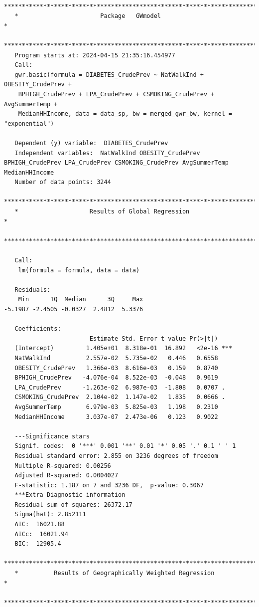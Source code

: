 \documentclass[
]{article}
\begin{document}
\begin{verbatim}
   ***********************************************************************
   *                       Package   GWmodel                             *
   ***********************************************************************
   Program starts at: 2024-04-15 21:35:16.454977 
   Call:
   gwr.basic(formula = DIABETES_CrudePrev ~ NatWalkInd + OBESITY_CrudePrev + 
    BPHIGH_CrudePrev + LPA_CrudePrev + CSMOKING_CrudePrev + AvgSummerTemp + 
    MedianHHIncome, data = data_sp, bw = merged_gwr_bw, kernel = "exponential")

   Dependent (y) variable:  DIABETES_CrudePrev
   Independent variables:  NatWalkInd OBESITY_CrudePrev BPHIGH_CrudePrev LPA_CrudePrev CSMOKING_CrudePrev AvgSummerTemp MedianHHIncome
   Number of data points: 3244
   ***********************************************************************
   *                    Results of Global Regression                     *
   ***********************************************************************

   Call:
    lm(formula = formula, data = data)

   Residuals:
    Min      1Q  Median      3Q     Max 
-5.1987 -2.4505 -0.0327  2.4812  5.3376 

   Coefficients:
                        Estimate Std. Error t value Pr(>|t|)    
   (Intercept)         1.405e+01  8.318e-01  16.892   <2e-16 ***
   NatWalkInd          2.557e-02  5.735e-02   0.446   0.6558    
   OBESITY_CrudePrev   1.366e-03  8.616e-03   0.159   0.8740    
   BPHIGH_CrudePrev   -4.076e-04  8.522e-03  -0.048   0.9619    
   LPA_CrudePrev      -1.263e-02  6.987e-03  -1.808   0.0707 .  
   CSMOKING_CrudePrev  2.104e-02  1.147e-02   1.835   0.0666 .  
   AvgSummerTemp       6.979e-03  5.825e-03   1.198   0.2310    
   MedianHHIncome      3.037e-07  2.473e-06   0.123   0.9022    

   ---Significance stars
   Signif. codes:  0 '***' 0.001 '**' 0.01 '*' 0.05 '.' 0.1 ' ' 1 
   Residual standard error: 2.855 on 3236 degrees of freedom
   Multiple R-squared: 0.00256
   Adjusted R-squared: 0.0004027 
   F-statistic: 1.187 on 7 and 3236 DF,  p-value: 0.3067 
   ***Extra Diagnostic information
   Residual sum of squares: 26372.17
   Sigma(hat): 2.852111
   AIC:  16021.88
   AICc:  16021.94
   BIC:  12905.4
   ***********************************************************************
   *          Results of Geographically Weighted Regression              *
   ***********************************************************************


\end{verbatim}
\end{document}
